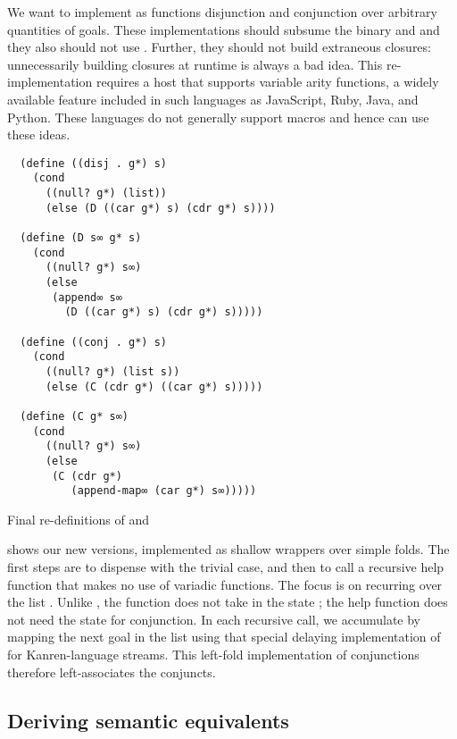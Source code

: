 \documentclass[sigplan,balance=true,pbalance=true,natbib=false]{acmart}
\begin{document}
We want to implement as functions disjunction and conjunction over
arbitrary quantities of goals. These implementations should subsume
the binary  and  and they also
should not use . Further, they should not build
extraneous closures: unnecessarily building closures at runtime is
always a bad idea. This re-implementation requires a host that
supports variable arity functions, a widely available feature included
in such languages as JavaScript, Ruby, Java, and Python. These
languages do not generally support macros and hence can use these ideas.

\begin{listing}
\begin{verbatim}
  (define ((disj . g*) s)
    (cond
      ((null? g*) (list))
      (else (D ((car g*) s) (cdr g*) s))))

  (define (D s∞ g* s)
    (cond
      ((null? g*) s∞)
      (else
       (append∞ s∞
         (D ((car g*) s) (cdr g*) s)))))

  (define ((conj . g*) s)
    (cond
      ((null? g*) (list s))
      (else (C (cdr g*) ((car g*) s)))))

  (define (C g* s∞)
    (cond
      ((null? g*) s∞)
      (else
       (C (cdr g*)
          (append-map∞ (car g*) s∞)))))
\end{verbatim}
  \caption{Final re-definitions of  and }\label{mnt:disj-reimplementation}
\end{listing}

 shows our new versions, implemented
as shallow wrappers over simple folds. The first steps are to dispense
with the trivial case, and then to call a recursive help function that
makes no use of variadic functions. The focus is on recurring over the
list . Unlike , the
function  does not take in the state ; the
help function does not need the state for conjunction. In each
recursive call, we accumulate by mapping the next goal in the list
using that special delaying implementation of 
for Kanren-language streams. This left-fold implementation of
conjunctions therefore left-associates the conjuncts.

\subsection{Deriving semantic equivalents}
\end{document}
